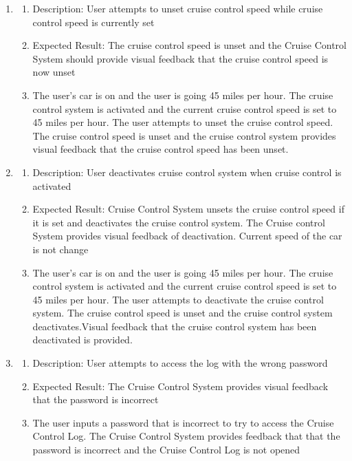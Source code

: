 \documentclass[preprint,11pt,3p]{article}
\begin{document}
\begin{enumerate}
	\item
		\begin{enumerate}
	\item Description: User attempts to unset cruise control speed while cruise control speed is currently set
	\item Expected Result: The cruise control speed is unset and the Cruise Control System should provide visual feedback that the cruise control speed is now unset
	\item The user’s car is on and the user is going 45 miles per hour. The cruise control system is activated and the current cruise control speed is set to 45 miles per hour. The user attempts to unset the cruise control speed. The cruise control speed is unset and the cruise control system provides visual feedback that the cruise control speed has been unset.
\end{enumerate}

	\item
		\begin{enumerate}
	\item Description: User deactivates cruise control system when cruise control is activated
	\item Expected Result: Cruise Control System unsets the cruise control speed if it is set and deactivates the cruise control system. The Cruise control System provides visual feedback of deactivation. Current speed of the car is not change
	\item The user’s car is on and the user is going 45 miles per hour. The cruise control system is activated and the current cruise control speed is set to 45 miles per hour. The user attempts to deactivate the cruise control system. The cruise control speed is unset and the cruise control system deactivates.Visual feedback that the cruise control system has been deactivated is provided.
\end{enumerate}

	\item
		\begin{enumerate}
	\item Description: User attempts to access the log with the wrong password
	\item Expected Result: The Cruise Control System provides visual feedback that the password is incorrect
	\item The user inputs a password that is incorrect to try to access the Cruise Control Log. The Cruise Control System provides feedback that that the password is incorrect and the Cruise Control Log is not opened
\end{enumerate}


\end{enumerate}
\end{document}

